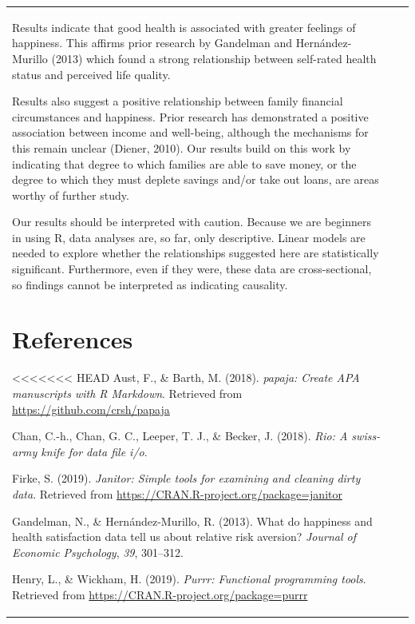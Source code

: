 \documentclass[man, fleqn, noextraspace,floatsintext]{apa6}
\begin{document}
\begin{tabular}{l|l|r}
Results indicate that good health is associated with greater feelings of
happiness. This affirms prior research by Gandelman and
Hernández-Murillo (2013) which found a strong relationship between
self-rated health status and perceived life quality.

Results also suggest a positive relationship between family financial
circumstances and happiness. Prior research has demonstrated a positive
association between income and well-being, although the mechanisms for
this remain unclear (Diener, 2010). Our results build on this work by
indicating that degree to which families are able to save money, or the
degree to which they must deplete savings and/or take out loans, are
areas worthy of further study.

Our results should be interpreted with caution. Because we are beginners
in using R, data analyses are, so far, only descriptive. Linear models
are needed to explore whether the relationships suggested here are
statistically significant. Furthermore, even if they were, these data
are cross-sectional, so findings cannot be interpreted as indicating
causality.

\newpage

\hypertarget{references}{%
\section{References}\label{references}}

\begingroup
\setlength{\parindent}{-0.5in}
\setlength{\leftskip}{0.5in}

\hypertarget{refs}{}
<<<<<<< HEAD
\leavevmode\hypertarget{ref-R-papaja}{}%
Aust, F., \& Barth, M. (2018). \emph{papaja: Create APA manuscripts with R Markdown}. Retrieved from \url{https://github.com/crsh/papaja}

\leavevmode\hypertarget{ref-R-rio}{}%
Chan, C.-h., Chan, G. C., Leeper, T. J., \& Becker, J. (2018). \emph{Rio: A swiss-army knife for data file i/o}.

\leavevmode\hypertarget{ref-R-janitor}{}%
Firke, S. (2019). \emph{Janitor: Simple tools for examining and cleaning dirty data}. Retrieved from \url{https://CRAN.R-project.org/package=janitor}

\leavevmode\hypertarget{ref-gandelman2013happiness}{}%
Gandelman, N., \& Hernández-Murillo, R. (2013). What do happiness and health satisfaction data tell us about relative risk aversion? \emph{Journal of Economic Psychology}, \emph{39}, 301--312.

\leavevmode\hypertarget{ref-R-purrr}{}%
Henry, L., \& Wickham, H. (2019). \emph{Purrr: Functional programming tools}. Retrieved from \url{https://CRAN.R-project.org/package=purrr}


\end{tabular}
\end{document}
